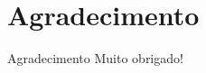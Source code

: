 \AtBeginSection[]{
	\begin{frame}
		\frametitle{}
		\tableofcontents[currentsection]
	\end{frame}
}

\section{Agradecimento}
\begin{frame}{Agradecimento}
    \centering Muito obrigado!
\end{frame}